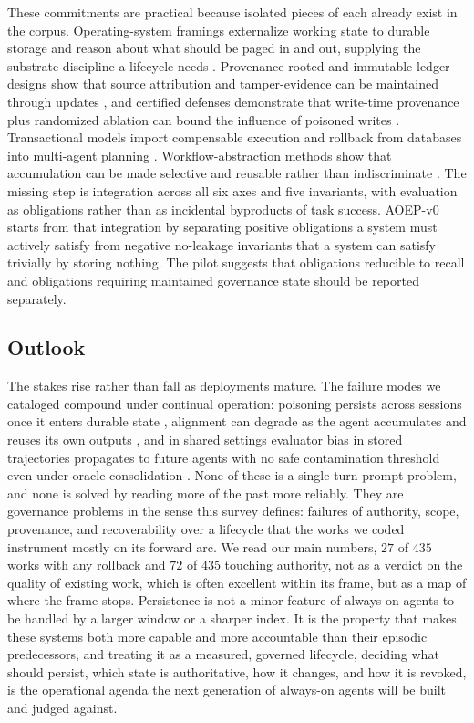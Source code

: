 These commitments are practical because isolated pieces of each already exist in the corpus. Operating-system framings externalize working state to durable storage and reason about what should be paged in and out, supplying the substrate discipline a lifecycle needs \citep{packer2024memgptllmsoperatingsystems}. Provenance-rooted and immutable-ledger designs show that source attribution and tamper-evidence can be maintained through updates \citep{wright2025immutablemem}, and certified defenses demonstrate that write-time provenance plus randomized ablation can bound the influence of poisoned writes \citep{sharma2026smsrcertified}. Transactional models import compensable execution and rollback from databases into multi-agent planning \citep{chang2025sagallm}. Workflow-abstraction methods show that accumulation can be made selective and reusable rather than indiscriminate \citep{wang2024agentworkflowmemory}. The missing step is integration across all six axes and five invariants, with evaluation as obligations rather than as incidental byproducts of task success. AOEP-v0 starts from that integration by separating positive obligations a system must actively satisfy from negative no-leakage invariants that a system can satisfy trivially by storing nothing. The pilot suggests that obligations reducible to recall and obligations requiring maintained governance state should be reported separately.

\subsection{Outlook}

The stakes rise rather than fall as deployments mature. The failure modes we cataloged compound under continual operation: poisoning persists across sessions once it enters durable state \citep{xie2026crosssessioninjection}, alignment can degrade as the agent accumulates and reuses its own outputs \citep{shao2025misevolution}, and in shared settings evaluator bias in stored trajectories propagates to future agents with no safe contamination threshold even under oracle consolidation \citep{liu2026memorycontagion}. None of these is a single-turn prompt problem, and none is solved by reading more of the past more reliably. They are governance problems in the sense this survey defines: failures of authority, scope, provenance, and recoverability over a lifecycle that the works we coded instrument mostly on its forward arc. We read our main numbers, $27$ of $435$ works with any rollback and $72$ of $435$ touching authority, not as a verdict on the quality of existing work, which is often excellent within its frame, but as a map of where the frame stops. Persistence is not a minor feature of always-on agents to be handled by a larger window or a sharper index. It is the property that makes these systems both more capable and more accountable than their episodic predecessors, and treating it as a measured, governed lifecycle, deciding what should persist, which state is authoritative, how it changes, and how it is revoked, is the operational agenda the next generation of always-on agents will be built and judged against.
